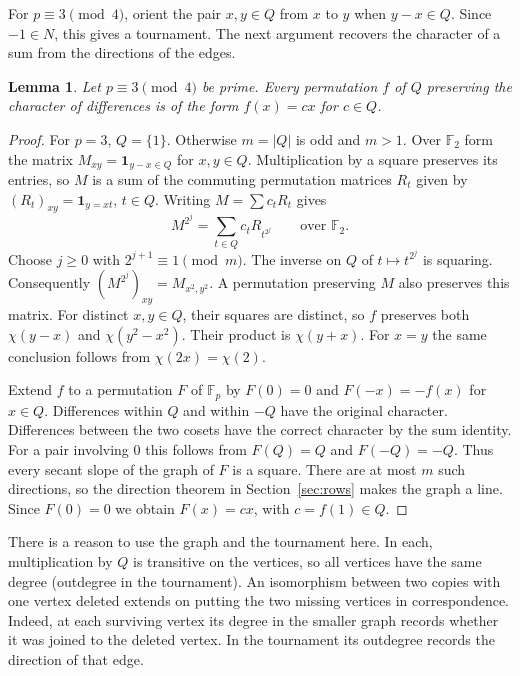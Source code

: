 \documentclass[11pt,a4paper]{article}
\newtheorem{lemma}[theorem]{Lemma}
\numberwithin{equation}{section}
\begin{document}
For $p\equiv3\pmod4$, orient the pair $x,y\in Q$ from $x$ to $y$ when $y-x\in Q$. Since $-1\in N$, this gives a tournament. The next argument recovers the character of a sum from the directions of the edges.

\begin{lemma}\label{prime:tournament}
Let $p\equiv3\pmod4$ be prime. Every permutation $f$ of $Q$ preserving the character of differences is of the form $f(x)=cx$ for $c\in Q$.
\end{lemma}
\begin{proof}
For $p=3$, $Q=\{1\}$. Otherwise $m=|Q|$ is odd and $m>1$. Over $\mathbb F_2$ form the matrix $M_{xy}=\mathbf1_{y-x\in Q}$ for $x,y\in Q$. Multiplication by a square preserves its entries, so $M$ is a sum of the commuting permutation matrices $R_t$ given by $(R_t)_{xy}=\mathbf1_{y=xt}$, $t\in Q$. Writing $M=\sum c_t R_t$ gives
$$M^{2^j}=\sum_{t\in Q}c_t R_{t^{2^j}}\qquad\text{over }\mathbb F_2.$$
Choose $j\ge0$ with $2^{j+1}\equiv1\pmod m$. The inverse on $Q$ of $t\mapsto t^{2^j}$ is squaring. Consequently $(M^{2^j})_{xy}=M_{x^2,y^2}$. A permutation preserving $M$ also preserves this matrix. For distinct $x,y\in Q$, their squares are distinct, so $f$ preserves both $\chi(y-x)$ and $\chi(y^2-x^2)$. Their product is $\chi(y+x)$. For $x=y$ the same conclusion follows from $\chi(2x)=\chi(2)$.

Extend $f$ to a permutation $F$ of $\mathbb F_p$ by $F(0)=0$ and $F(-x)=-f(x)$ for $x\in Q$. Differences within $Q$ and within $-Q$ have the original character. Differences between the two cosets have the correct character by the sum identity. For a pair involving $0$ this follows from $F(Q)=Q$ and $F(-Q)=-Q$. Thus every secant slope of the graph of $F$ is a square. There are at most $m$ such directions, so the direction theorem in Section~\ref{sec:rows} makes the graph a line. Since $F(0)=0$ we obtain $F(x)=cx$, with $c=f(1)\in Q$.
\end{proof}

There is a reason to use the graph and the tournament here. In each, multiplication by $Q$ is transitive on the vertices, so all vertices have the same degree (outdegree in the tournament). An isomorphism between two copies with one vertex deleted extends on putting the two missing vertices in correspondence. Indeed, at each surviving vertex its degree in the smaller graph records whether it was joined to the deleted vertex. In the tournament its outdegree records the direction of that edge.
\end{document}
